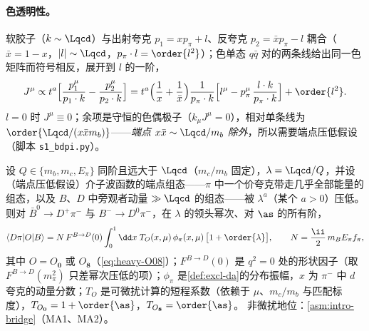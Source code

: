 \paragraph{色透明性。}
软胶子（$k\sim\Lqcd$）与出射夸克 $p_1=xp_\pi+l$、反夸克 $p_2=\bar xp_\pi-l$ 耦合（$\bar x=1-x$，$|l|\sim\Lqcd$，$p_\pi\cdot l=\order{l^2}$）；色单态 $q\bar q$ 对的两条线给出同一色矩阵而符号相反，展开到 $l$ 的一阶，
\begin{equation}\label{eq:heavy-dipole}
J^\mu\propto t^a\Big[\frac{p_1^\mu}{p_1\cdot k}-\frac{p_2^\mu}{p_2\cdot k}\Big]
=t^a\Big(\frac1x+\frac1{\bar x}\Big)\frac{1}{p_\pi\cdot k}\Big[l^\mu-p_\pi^\mu\,\frac{l\cdot k}{p_\pi\cdot k}\Big]+\order{l^2}.
\end{equation}
$l=0$ 时 $J^\mu\equiv0$；余项是守恒的色偶极子（$k_\mu J^\mu=0$），相对单条线为 $\order{\Lqcd/(x\bar xm_b)}$——\emph{端点 $x\bar x\sim\Lqcd/m_b$ 除外}，所以需要端点压低假设（脚本 \texttt{s1\_\allowbreak bdpi.py}）。

\begin{theorem}\label{thm:heavy-bdpi}
设 $Q\in\{m_b,m_c,E_\pi\}$ 同阶且远大于 $\Lqcd$（$m_c/m_b$ 固定），$\lambda=\Lqcd/Q$，并设（端点压低假设）介子波函数的端点组态——$\pi$ 中一个价夸克带走几乎全部能量的组态，以及 $B$、$D$ 中旁观者动量 $\gg\Lqcd$ 的组态——被 $\lambda^{a}$（某个 $a>0$）压低。则对 $\bar B^0\to D^+\pi^-$ 与 $B^-\to D^0\pi^-$，在 $\lambda$ 的领头幂次、对 $\as$ 的所有阶，
\begin{equation}\label{eq:heavy-bdpi}
\langle D\pi|O|B\rangle=N\,F^{B\to D}(0)\int_0^1\dd x\;T_O(x,\mu)\,\phi_\pi(x,\mu)\,\big[1+\order{\lambda}\big],\qquad N=\frac{\ii}{2}\,m_BE_\pi f_\pi ,
\end{equation}
其中 $O=O_{\mathbf 0}$ 或 $O_{\mathbf 8}$（\cref{eq:heavy-O08}）；$F^{B\to D}(0)$ 是 $q^2=0$ 处的形状因子（取 $F^{B\to D}(m_\pi^2)$ 只差幂次压低的项）；$\phi_\pi$ 是\cref{def:excl-da}的分布振幅，$x$ 为 $\pi^-$ 中 $d$ 夸克的动量分数；$T_O$ 是可微扰计算的短程系数（依赖于 $\mu$、$m_c/m_b$ 与匹配标度），$T_{O_{\mathbf 0}}=1+\order{\as}$，$T_{O_{\mathbf 8}}=\order{\as}$。
非微扰地位：\cref{asm:intro-bridge}（MA1、MA2）。
\end{theorem}

